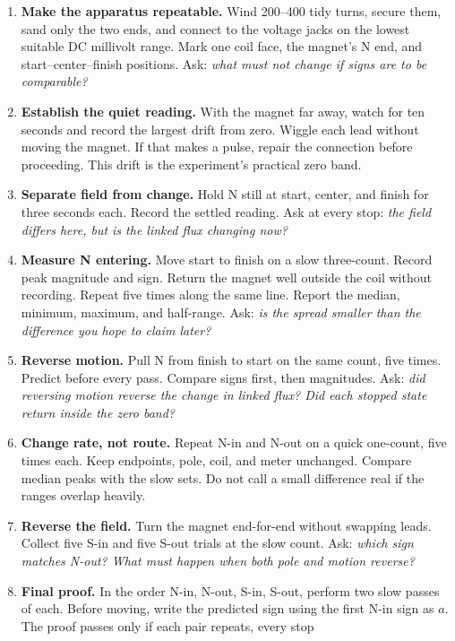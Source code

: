 \begin{enumerate}
\item \textbf{Make the apparatus repeatable.} Wind 200--400 tidy turns, secure
  them, sand only the two ends, and connect to the voltage jacks on the lowest
  suitable DC millivolt range. Mark one coil face, the magnet's N end, and
  start--center--finish positions. Ask: \emph{what must not change if signs are
  to be comparable?}
\item \textbf{Establish the quiet reading.} With the magnet far away, watch for
  ten seconds and record the largest drift from zero. Wiggle each lead without
  moving the magnet. If that makes a pulse, repair the connection before
  proceeding. This drift is the experiment's practical zero band.
\item \textbf{Separate field from change.} Hold N still at start, center, and
  finish for three seconds each. Record the settled reading. Ask at every
  stop: \emph{the field differs here, but is the linked flux changing now?}
\item \textbf{Measure N entering.} Move start to finish on a slow three-count.
  Record peak magnitude and sign. Return the magnet well outside the coil
  without recording. Repeat five times along the same line. Report the median,
  minimum, maximum, and half-range. Ask: \emph{is the spread smaller than the
  difference you hope to claim later?}
\item \textbf{Reverse motion.} Pull N from finish to start on the same count,
  five times. Predict before every pass. Compare signs first, then magnitudes.
  Ask: \emph{did reversing motion reverse the change in linked flux? Did each
  stopped state return inside the zero band?}
\item \textbf{Change rate, not route.} Repeat N-in and N-out on a quick
  one-count, five times each. Keep endpoints, pole, coil, and meter unchanged.
  Compare median peaks with the slow sets. Do not call a small difference real
  if the ranges overlap heavily.
\item \textbf{Reverse the field.} Turn the magnet end-for-end without swapping
  leads. Collect five S-in and five S-out trials at the slow count. Ask:
  \emph{which sign matches N-out? What must happen when both pole and motion
  reverse?}
\item \textbf{Final proof.} In the order N-in, N-out, S-in, S-out, perform two
  slow passes of each. Before moving, write the predicted sign using the first
  N-in sign as \(a\). The proof passes only if each pair repeats, every stop

\end{enumerate}
